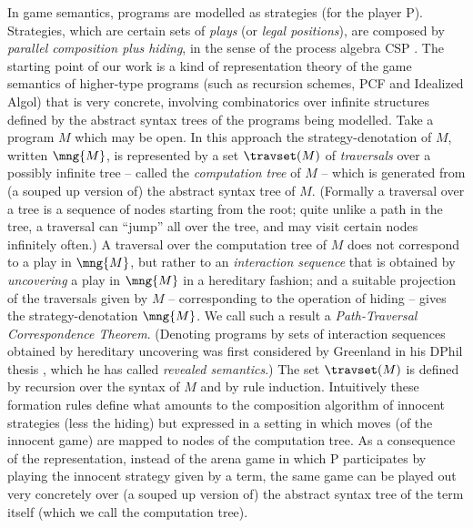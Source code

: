 In game semantics, programs are modelled as strategies (for the player P). Strategies, which are certain sets of \emph{plays} (or \emph{legal positions}), are composed by \emph{parallel composition plus hiding}, in the sense of the process algebra CSP \cite{Hoa85}. The starting point of our work is a kind of representation theory of the game semantics of higher-type programs (such as recursion schemes, PCF and Idealized Algol) that is very concrete, involving combinatorics over infinite structures defined by the abstract syntax trees of the programs being modelled. Take a program $M$ which may be open. In this approach the strategy-denotation of $M$, written $\mng{M}$, is represented by a set $\travset(M)$ of \emph{traversals} over a possibly infinite tree -- called the \emph{computation tree} of $M$ -- which is generated from (a souped up version of) the abstract syntax tree of $M$. (Formally a traversal over a tree is a sequence of nodes starting from the root; quite unlike a path in the tree, a traversal can ``jump'' all over the tree, and may visit certain nodes infinitely often.) A traversal over the computation tree of $M$ does not correspond to a play in $\mng{M}$, but rather to an \emph{interaction sequence} that is obtained by \emph{uncovering} \cite{hylandong_pcf} a play in $\mng{M}$ in a hereditary fashion; and a suitable projection of the traversals given by $M$ -- corresponding to the operation of hiding -- gives the strategy-denotation $\mng{M}$. We call such a result a \emph{Path-Traversal Correspondence Theorem}. (Denoting programs by sets of interaction sequences obtained by hereditary uncovering was first considered by Greenland in his DPhil thesis \cite{willgreenlandthesis}, which he has called \emph{revealed semantics}.) The set $\travset(M)$ is defined by recursion over the syntax of $M$ and by rule induction.
Intuitively these formation rules define what amounts to the composition algorithm of innocent strategies (less the hiding) but expressed in a setting in which moves (of the innocent game) are mapped to nodes of the computation tree. As a consequence of the representation, instead of the arena game in which P participates by playing the innocent strategy given by a term, the same game can be played out very concretely over (a souped up version of) the abstract syntax tree of the term itself (which we call the computation tree).

